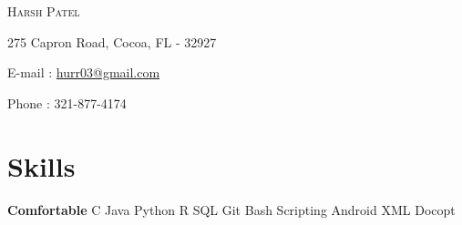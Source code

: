 \documentclass{my_resume_class}
\newcommand{\name}[1]{
   \centerline{\textsc{\huge{#1}}}
}
\newcommand{\contact}[1]{
   \centerline{\normalsize{#1}}
}
\begin{document}
\name{Harsh Patel}
\vspace{0.1cm}
\contact{275 Capron Road, Cocoa, FL - 32927}
\vspace{0.05cm}
\contact{E-mail : \href{mailto:hurr03@gmail.com}{hurr03@gmail.com}}
\vspace{0.05cm}
\contact{Phone : 321-877-4174 }


\section{Skills}
{\textbf{Comfortable}  \hspace{0.80cm} C\hspace{0.50cm} Java\hspace{0.50cm} Python \hspace{0.50cm} R \hspace{0.50cm} SQL\hspace{0.50cm}  Git\hspace{0.50cm} Bash Scripting\hspace{0.50cm} Android\hspace{0.50cm} XML\hspace{0.50cm} Docopt } \\
\end{document}

